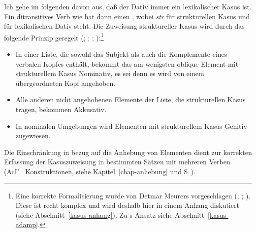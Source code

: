 Ich gehe im folgenden davon aus, daß der Dativ immer ein lexikalischer Kasus ist. 
Ein ditransitives Verb wie  hat dann einen \subcatw {},
wobei \textit{str\/} für strukturellen Kasus und  für lexikalischen Dativ steht.
Die Zuweisung struktureller Kasus wird durch das folgende Prinzip geregelt (\citealp{Prze99}; 
\citealp{Meurers99b}; \citealp[Kapitel~10.4.1.4]{Meurers2000b}; \citealp{MdK2001a}):\footnote{
  Eine korrekte Formalisierung wurde von Detmar Meurers
  vorgeschlagen (\citealp{Meurers99b}; \citealp{MdK2001a}; \citealp[Kapitel~10.4.1.4]{Meurers2000b}).
  Diese ist recht komplex und wird deshalb hier in einem Anhang diskutiert (siehe Abschnitt~\ref{kasus-anhang}).
  Zu \prz{}s Ansatz siehe Abschnitt~\ref{kasus-adamp}.%
}
\begin{prinzip-break}[Kasusprinzip]
\label{case-p}
\begin{itemize}
\item In einer Liste, die sowohl das Subjekt als auch die Komplemente eines verbalen Kopfes
      enthält, bekommt das am wenigsten oblique Element mit strukturellem Kasus 
      Nominativ, es sei denn es wird von einem übergeordneten Kopf angehoben.
\item Alle anderen nicht angehobenen Elemente der Liste, die strukturellen Kasus tragen, bekommen Akkusativ.
\item In nominalen Umgebungen wird Elementen mit strukturellem Kasus Genitiv zugewiesen.
\end{itemize}
\end{prinzip-break}
Die Einschränkung in bezug auf die Anhebung von Elementen dient zur korrekten Erfassung der
Kasuszuweisung in bestimmten Sätzen mit mehreren Verben (\zb AcI"=Konstruktionen, siehe
Kapitel~\ref{chap-anhebung} und S.\,\pageref{page-aci-kasus}).

